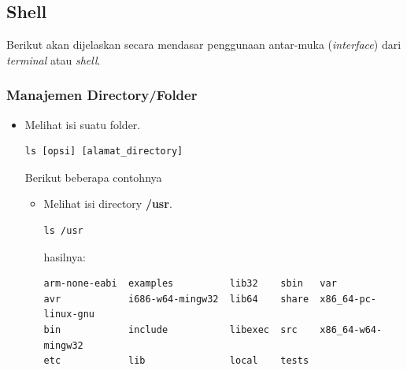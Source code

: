 \documentclass[12pt,]{article}
\begin{document}
	\subsection{Shell}
	Berikut akan dijelaskan secara mendasar penggunaan antar-muka (\textit{interface}) dari \textit{terminal} atau \textit{shell}.
	\subsubsection{Manajemen Directory/Folder}
	\begin{itemize}
		\item Melihat isi suatu folder.
		\begin{verbatim}
ls [opsi] [alamat_directory]
		\end{verbatim}
		Berikut beberapa contohnya
		\begin{itemize}
			\item Melihat isi directory \textbf{/usr}.
			\begin{verbatim}
ls /usr
			\end{verbatim}
			hasilnya:
			\begin{verbatim}
arm-none-eabi  examples          lib32    sbin   var
avr            i686-w64-mingw32  lib64    share  x86_64-pc-linux-gnu
bin            include           libexec  src    x86_64-w64-mingw32
etc            lib               local    tests
			\end{verbatim}


\end{itemize}
\end{itemize}
\end{document}
